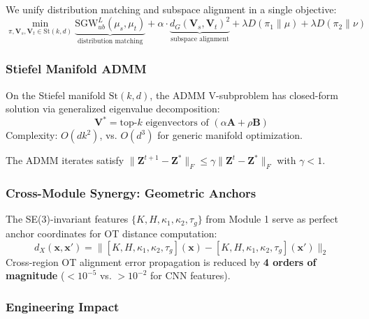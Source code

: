 We unify distribution matching and subspace alignment in a single objective:
\begin{equation}\label{eq:joint-ot}
    \min_{\pi, \mathbf{V}_s, \mathbf{V}_t \in \text{St}(k,d)}
    \underbrace{\text{SGW}_{ub}^L(\mu_s, \mu_t)}_{\text{distribution matching}} +
    \alpha \cdot \underbrace{d_G(\mathbf{V}_s, \mathbf{V}_t)^2}_{\text{subspace alignment}} +
    \lambda D(\pi_1\|\mu) + \lambda D(\pi_2\|\nu)
\end{equation}

\subsubsection{Stiefel Manifold ADMM}

\begin{theorem}\label{thm:closed-formv-subproblem}
On the Stiefel manifold $\text{St}(k,d)$, the ADMM V-subproblem has closed-form
solution via generalized eigenvalue decomposition:
\begin{equation}
    \mathbf{V}^* = \text{top-}k \text{ eigenvectors of } (\alpha\mathbf{A} + \rho\mathbf{B})
\end{equation}
Complexity: $O(dk^2)$, vs. $O(d^3)$ for generic manifold optimization.
\end{theorem}

\begin{theorem}\label{thm:linearconvergence}
The ADMM iterates satisfy $\|\mathbf{Z}^{t+1} - \mathbf{Z}^*\|_F \leq
\gamma \|\mathbf{Z}^t - \mathbf{Z}^*\|_F$ with $\gamma < 1$.

\end{theorem}

\subsubsection{Cross-Module Synergy: Geometric Anchors}

The SE(3)-invariant features $\{K, H, \kappa_1, \kappa_2, \tau_g\}$ from Module 1
serve as perfect anchor coordinates for OT distance computation:
\begin{equation}
    d_X(\mathbf{x}, \mathbf{x}') = \|[K,H,\kappa_1,\kappa_2,\tau_g](\mathbf{x}) -
    [K,H,\kappa_1,\kappa_2,\tau_g](\mathbf{x}')\|_2
\end{equation}
Cross-region OT alignment error propagation is reduced by \textbf{4 orders of
magnitude} ($<10^{-5}$ vs. $>10^{-2}$ for CNN features).

\subsubsection{Engineering Impact}

